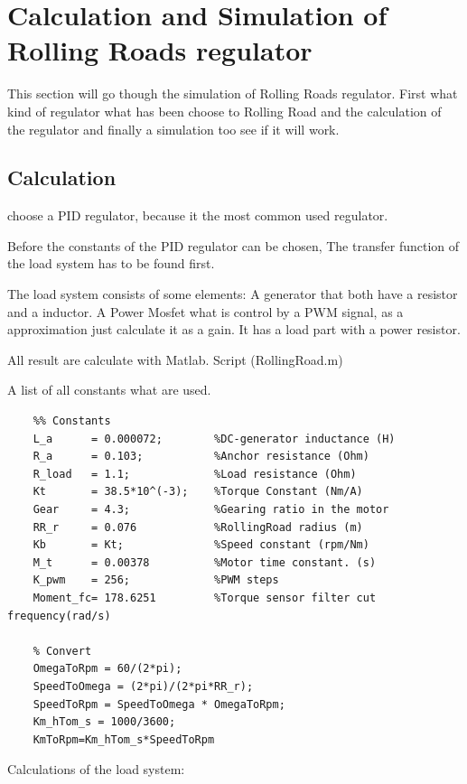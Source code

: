 \newpage
\section{Calculation and Simulation of Rolling Roads regulator}

This section will go though the simulation of Rolling Roads regulator. First what kind of regulator what has been choose to Rolling Road and the calculation of the regulator and finally a simulation too see if it will work.

\subsection{Calculation}

choose a PID regulator, because it the most common used regulator.

Before the constants of the PID regulator can be chosen, The transfer function of the load system has to be found first.

The load system consists of some elements: A generator that both have a resistor and a inductor. A Power Mosfet what is control by a PWM signal, as a approximation just calculate it as a gain. It has a load part with a power resistor.

All result are calculate with Matlab. Script (RollingRoad.m)   

A list of all constants what are used.

\begin{lstlisting}
	%% Constants
	L_a      = 0.000072;        %DC-generator inductance (H)
	R_a      = 0.103;           %Anchor resistance (Ohm)
	R_load   = 1.1;             %Load resistance (Ohm)
	Kt       = 38.5*10^(-3);    %Torque Constant (Nm/A)
	Gear     = 4.3;             %Gearing ratio in the motor
	RR_r     = 0.076            %RollingRoad radius (m)
	Kb       = Kt;              %Speed constant (rpm/Nm)
	M_t      = 0.00378          %Motor time constant. (s)
	K_pwm    = 256;             %PWM steps 
	Moment_fc= 178.6251			%Torque sensor filter cut frequency(rad/s)
	
	% Convert 
	OmegaToRpm = 60/(2*pi);
	SpeedToOmega = (2*pi)/(2*pi*RR_r);
	SpeedToRpm = SpeedToOmega * OmegaToRpm;
	Km_hTom_s = 1000/3600;
	KmToRpm=Km_hTom_s*SpeedToRpm
\end{lstlisting} 

Calculations of the load system:

